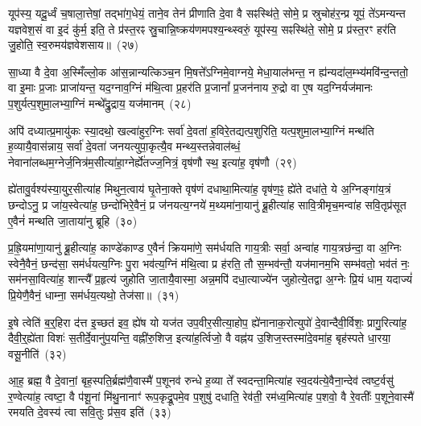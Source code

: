 यूप॑स्य॒ यदू॒र्ध्वं च॒षाला॒त्तेषां॒ तद्भा॑ग॒धेयं॒ ताने॒व तेन॑ प्रीणाति दे॒वा वै सꣴस्थि॑ते॒ सोमे॒ प्र स्रुचोह॑र॒न्प्र यूपं॒ ते॑\-ऽमन्यन्त यज्ञवेश॒सं वा इ॒दं कु॑र्म॒ इति॒ ते प्र॑स्त॒रꣴ स्रु॒चान्नि॒ष्क्रय॑णमपश्य॒न्थ्स्वरुं॒ यूप॑स्य॒ सꣴस्थि॑ते॒ सोमे॒ प्र प्र॑स्त॒रꣳ हर॑ति जु॒होति॒ स्व॒रुमय॑ज्ञवेशसाय॥~(२७)\ip

{}

सा॒ध्या वै दे॒वा अ॒स्मिँल्लो॒क आ॑स॒न्नान्यत्किञ्च॒न मि॒षत्ते᳚\-ऽग्निमे॒वाग्नये॒ मेधा॒याल॑भन्त॒ न ह्य॑न्यदा॑ल॒म्भ्य॑मवि॑न्द॒न्ततो॒ वा इ॒माः प्र॒जाः प्राजा॑यन्त॒ यद॒ग्नाव॒ग्निं म॑थि॒त्वा प्र॒हर॑ति प्र॒जानां᳚ प्र॒जन॑नाय रु॒द्रो वा ए॒ष यद॒ग्निर्यज॑मानः प॒शुर्यत्प॒शुमा॒लभ्या॒ग्निं मन्थे᳚द्रु॒द्राय॒ यज॑मानम्~(२८)\ip

अपि॑ दध्यात्प्र॒मायु॑कः स्या॒दथो॒ खल्वा॑हुर॒ग्निः सर्वा॑ दे॒वता॑ ह॒विरे॒तद्यत्प॒शुरिति॒ यत्प॒शुमा॒लभ्या॒ग्निं मन्थ॑ति ह॒व्यायै॒वास॑न्नाय॒ सर्वा॑ दे॒वता॑ जनयत्युपा॒कृत्यै॒व मन्थ्य॒स्तन्नेवाल॑ब्धं॒ नेवाना॑लब्धम॒ग्नेर्ज॒नित्र॑म॒सीत्या॑हा॒ग्नेर्\mbox{}ह्ये॑तज्ज॒नित्रं॒ वृष॑णौ स्थ॒ इत्या॑ह॒ वृष॑णौ~(२९)\ip

ह्ये॑तावु॒र्वश्य॑स्या॒युर॒सीत्या॑ह मिथुन॒त्वाय॑ घृ॒तेना॒क्ते वृष॑णं दधाथा॒मित्या॑ह॒ वृष॑ण॒ꣴ॒ ह्ये॑ते दधा॑ते॒ ये अ॒ग्निङ्गा॑य॒त्रं छन्दो\-ऽनु॒ प्र जा॑य॒स्वेत्या॑ह॒ छन्दो॑भिरे॒वैनं॒ प्र ज॑नयत्य॒ग्नये॑ म॒थ्यमा॑ना॒यानु॑ ब्रू॒हीत्या॑ह सावि॒त्रीमृच॒मन्वा॑ह सवि॒तृप्र॑सूत ए॒वैनं॑ मन्थति जा॒ताया॑नु ब्रूहि~(३०)\ip

प्र॒ह्रि॒यमा॑णा॒यानु॑ ब्रू॒हीत्या॑ह॒ काण्डे॑काण्ड ए॒वैनं॑ क्रियमा॑णे॒ सम॑र्धयति गाय॒त्रीः सर्वा॒ अन्वा॑ह गाय॒त्रछ॑न्दा॒ वा अ॒ग्निः स्वेनै॒वैनं॒ छन्द॑सा॒ सम॑र्धयत्य॒ग्निः पु॒रा भव॑त्य॒ग्निं म॑थि॒त्वा प्र ह॑रति॒ तौ स॒म्भव॑न्तौ॒ यज॑मानम॒भि सम्भ॑वतो॒ भव॑तं नः॒ सम॑नसा॒वित्या॑ह॒ शान्त्यै᳚ प्र॒हृत्य॑ जुहोति जा॒तायै॒वास्मा॒ अन्न॒मपि॑ दधा॒त्याज्ये॑न जुहोत्ये॒तद्वा अ॒ग्नेः प्रि॒यं धाम॒ यदाज्यं॑ प्रि॒येणै॒वैनं॒ धाम्ना॒ सम॑र्धय॒त्यथो॒ तेज॑सा॥~(३१)\ip

{\anuvakamend[{यज॑मानमाह॒ वृष॑णौ जाता॒यानु॑ब्रू॒ह्यप्य॒ष्टाद॑श च}]}

इ॒षे त्वेति॑ ब॒र्॒\mbox{}हिरा द॑त्त इ॒च्छत॑ इव॒ ह्ये॑ष यो यज॑त उप॒वीर॒सीत्या॒होप॒ ह्ये॑नानाक॒रोत्युपो॑ दे॒वान्दैवी॒र्विशः॒ प्रागु॒रित्या॑ह॒ दैवी॒र्॒\mbox{}ह्ये॑ता विशः॑ स॒तीर्दे॒वानु॑प॒यन्ति॒ वह्नी॑रु॒शिज॒ इत्या॑ह॒र्त्विजो॒ वै वह्न॑य उ॒शिज॒स्तस्मा॑दे॒वमा॑ह॒ बृह॑स्पते धा॒रया॒ वसू॒नीति॑~(३२)\ip

आ॒ह॒ ब्रह्म॒ वै दे॒वानां॒ बृह॒स्पति॒र्ब्रह्म॑णै॒वास्मै॑ प॒शूनव॑ रुन्धे ह॒व्या ते᳚ स्वदन्ता॒मित्या॑ह स्व॒दय॑त्ये॒वैना॒न्देव॑ त्वष्ट॒र्वसु॑ र॒ण्वेत्या॑ह॒ त्वष्टा॒ वै प॑शू॒नां मि॑थु॒नानाꣳ॑ रूप॒कृद्रू॒पमे॒व प॒शुषु॑ दधाति॒ रेव॑ती॒ रम॑ध्व॒मित्या॑ह प॒शवो॒ वै रे॒वतीः᳚ प॒शूने॒वास्मै॑ रमयति दे॒वस्य॑ त्वा सवि॒तुः प्र॑स॒व इति॑~(३३)\ip

